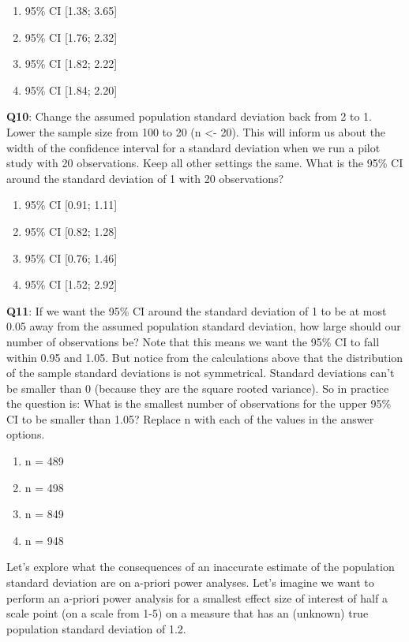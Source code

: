 \documentclass[
]{krantz}
\providecommand{\tightlist}{%
  \setlength{\itemsep}{0pt}\setlength{\parskip}{0pt}}
\begin{document}
\begin{enumerate}
\def\labelenumi{\Alph{enumi})}
\tightlist
\item
  95\% CI {[}1.38; 3.65{]}
\item
  95\% CI {[}1.76; 2.32{]}
\item
  95\% CI {[}1.82; 2.22{]}
\item
  95\% CI {[}1.84; 2.20{]}
\end{enumerate}

\textbf{Q10}: Change the assumed population standard deviation back from 2 to 1. Lower the sample size from 100 to 20 (n \textless- 20). This will inform us about the width of the confidence interval for a standard deviation when we run a pilot study with 20 observations. Keep all other settings the same. What is the 95\% CI around the standard deviation of 1 with 20 observations?

\begin{enumerate}
\def\labelenumi{\Alph{enumi})}
\tightlist
\item
  95\% CI {[}0.91; 1.11{]}
\item
  95\% CI {[}0.82; 1.28{]}
\item
  95\% CI {[}0.76; 1.46{]}
\item
  95\% CI {[}1.52; 2.92{]}
\end{enumerate}

\textbf{Q11}: If we want the 95\% CI around the standard deviation of 1 to be at most 0.05 away from the assumed population standard deviation, how large should our number of observations be? Note that this means we want the 95\% CI to fall within 0.95 and 1.05. But notice from the calculations above that the distribution of the sample standard deviations is not symmetrical. Standard deviations can't be smaller than 0 (because they are the square rooted variance). So in practice the question is: What is the smallest number of observations for the upper 95\% CI to be smaller than 1.05? Replace n with each of the values in the answer options.

\begin{enumerate}
\def\labelenumi{\Alph{enumi})}
\tightlist
\item
  n = 489
\item
  n = 498
\item
  n = 849
\item
  n = 948
\end{enumerate}

Let's explore what the consequences of an inaccurate estimate of the population standard deviation are on a-priori power analyses. Let's imagine we want to perform an a-priori power analysis for a smallest effect size of interest of half a scale point (on a scale from 1-5) on a measure that has an (unknown) true population standard deviation of 1.2.
\end{document}
